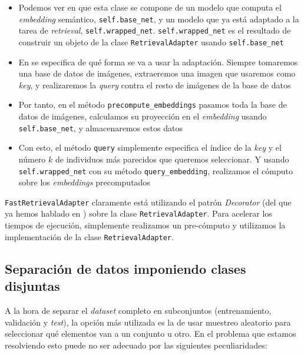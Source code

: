 \begin{itemize}
    \item Podemos ver en  que esta clase se compone de un modelo que computa el \textit{embedding} semántico, \lstinline{self.base_net}, y un modelo que ya está adaptado a la tarea de \textit{retrieval}, \lstinline{self.wrapped_net}. \lstinline{self.wrapped_net} es el resultado de construir un objeto de la clase \lstinline{RetrievalAdapter} usando \lstinline{self.base_net}
    \item En  se especifica de qué forma se va a usar la adaptación. Siempre tomaremos una base de datos de imágenes, extraeremos una imagen que usaremos como \textit{key}, y realizaremos la \textit{query} contra el resto de imágenes de la base de datos
    \item Por tanto, en el método \lstinline{precompute_embeddings} pasamos toda la base de datos de imágenes, calculamos su proyección en el \textit{embedding} usando \lstinline{self.base_net}, y almacenaremos estos datos
    \item Con esto, el método \lstinline{query} simplemente especifica el índice de la \textit{key} y el número $k$ de individuos más parecidos que queremos seleccionar. Y usando \lstinline{self.wrapped_net} con su método \lstinline{query_embedding}, realizamos el cómputo sobre los \textit{embeddings} precomputados
\end{itemize}

\begin{sloppypar}
\lstinline{FastRetrievalAdapter} claramente está utilizando el patrón \textit{Decorator} (del que ya hemos hablado en ) sobre la clase \lstinline{RetrievalAdapter}. Para acelerar los tiempos de ejecución, simplemente realizamos un pre-cómputo y utilizamos la implementación de la clase \lstinline{RetrievalAdapter}.
\end{sloppypar}

\subsection{Separación de datos imponiendo clases disjuntas}

A la hora de separar el \textit{dataset} completo en subconjuntos (entrenamiento, validación y \textit{test}), la opción más utilizada es la de usar muestreo aleatorio para seleccionar qué elementos van a un conjunto u otro. En el problema que estamos resolviendo esto puede no ser adecuado por las siguientes peculiaridades:

